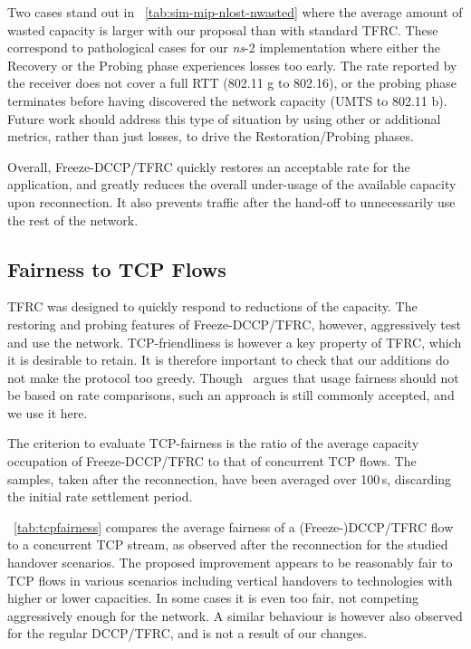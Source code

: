 \documentclass[twocolumn]{nictatechreport}
\newcommand{\ns}{\textit{ns}}
\begin{document}
Two cases stand out in \tablename~\ref{tab:sim-mip-nlost-nwasted} where the
average amount of wasted capacity is larger with our proposal than with standard
TFRC. These correspond to pathological cases for our \ns-2 implementation where
either the Recovery or the Probing phase experiences losses too early. The rate
reported by the receiver does not cover a full RTT (802.11 g to 802.16), or the
probing phase terminates before having discovered the network capacity (UMTS to
802.11 b). Future work should address this type of situation by using other or
additional metrics, rather than just losses, to drive the Restoration/Probing
phases.

Overall, Freeze-DCCP/TFRC quickly restores an acceptable rate for the
application, and greatly reduces the overall under-usage of the available
capacity upon reconnection. It also prevents traffic after the hand-off to
unnecessarily use the rest of the network.

\subsection{Fairness to TCP Flows}

TFRC was designed to quickly respond to reductions of the capacity. The
restoring and probing features of Freeze-DCCP/TFRC, however, aggressively test
and use the network. TCP-friendliness is however a key property of TFRC, which
it is desirable to retain. It is therefore important to check that our additions
do not make the protocol too greedy. Though~\cite{2007briscoe_fairness} argues
that usage fairness should not be based on rate comparisons, such an approach is
still commonly accepted, and we use it here.

The criterion to evaluate TCP-fairness is the ratio of the average capacity
occupation of Freeze-DCCP/TFRC to that of concurrent TCP flows. The samples, taken
after the reconnection, have been averaged over 100\,s, discarding the initial
rate settlement period.

\tablename~\ref{tab:tcpfairness} compares the average fairness of a
\mbox{(Freeze-)DCCP/TFRC} flow to a concurrent TCP stream, as observed after the
reconnection for the studied handover scenarios. The proposed improvement appears
to be reasonably fair to TCP flows in various scenarios including vertical
handovers to technologies with higher or lower capacities. In some cases it is
even too fair, not competing aggressively enough for the network. A similar
behaviour is however also observed for the regular DCCP/TFRC, and is not a
result of our changes.
\end{document}
